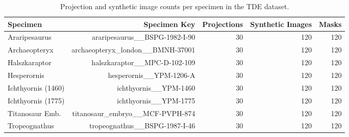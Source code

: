 \begin{table}[htbp]
\caption{Projection and synthetic image counts per specimen in the TDE dataset.}
\label{tab:specimen_distribution}
\begin{tabular}{lrrrr}
\toprule
Specimen & Specimen Key & Projections & Synthetic Images & Masks \\
\midrule
Araripesaurus & araripesaurus\_\_BSPG-1982-I-90 & 30 & 120 & 120 \\
Archaeopteryx & archaeopteryx\_london\_\_BMNH-37001 & 30 & 120 & 120 \\
Halszkaraptor & halszkaraptor\_\_MPC-D-102-109 & 30 & 120 & 120 \\
Hesperornis & hesperornis\_\_YPM-1206-A & 30 & 120 & 120 \\
Ichthyornis (1460) & ichthyornis\_\_YPM-1460 & 30 & 120 & 120 \\
Ichthyornis (1775) & ichthyornis\_\_YPM-1775 & 30 & 120 & 120 \\
Titanosaur Emb. & titanosaur\_embryo\_\_MCF-PVPH-874 & 30 & 120 & 120 \\
Tropeognathus & tropeognathus\_\_BSPG-1987-I-46 & 30 & 120 & 120 \\
\bottomrule
\end{tabular}
\end{table}
